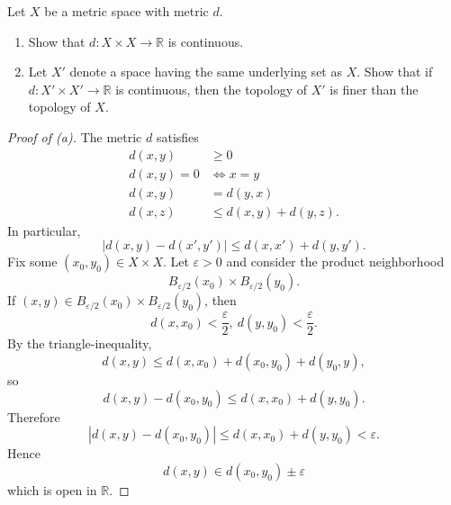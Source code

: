\begin{prob*}[Munkres 20.3]
    Let $X$ be a metric space with metric 
    $d$. 
    \begin{enumerate}[label=\alph*)]
        \item Show that $d : X \times X \to \mathbb R$ is continuous. 
        \item Let $X'$ denote a space having the 
            same underlying set as $X$. Show that 
            if $d : X' \times X' \to \mathbb R$ is continuous, 
            then the topology of $X'$ is finer than 
            the topology of $X$.
    \end{enumerate}
\end{prob*}

\begin{proof}[Proof of (a)]
    The metric $d$ satisfies 
    \begin{align*}
        d(x,y) &\geq 0 \\ 
        d(x,y) = 0 &\Leftrightarrow x = y \\ 
        d(x,y) &= d(y,x) \\ 
        d(x,z) &\leq d(x,y) + d(y,z). 
    \end{align*}
    In particular, 
    \[
        |d(x,y) - d(x',y')| \leq d(x,x') + d(y,y'). 
    \]
    Fix some $(x_0,y_0) \in X\times X$. 
    Let $\varepsilon > 0$ and consider 
    the product neighborhood 
    \[
        B_{\varepsilon/2}(x_0) \times B_{\varepsilon/2}(y_0).
    \]
    If $(x,y) \in B_{\varepsilon/2}(x_0) 
    \times B_{\varepsilon/2}(y_0)$, 
    then 
    \[
        d(x,x_0) < \frac{\varepsilon}{2}, \ 
        d(y,y_0) < \frac{\varepsilon}{2}. 
    \]
    By the triangle-inequality, 
    \[
        d(x,y) \leq d(x,x_0) + d(x_0, y_0) 
        + d(y_0, y), 
    \]
    so 
    \[
        d(x,y) - d(x_0,y_0) 
        \leq d(x,x_0) + d(y,y_0). 
    \]
    Therefore 
    \[
        |d(x,y) - d(x_0,y_0)| 
        \leq d(x,x_0) + d(y,y_0) < \varepsilon. 
    \]
    Hence 
    \[
        d(x,y) \in d(x_0,y_0) \pm \varepsilon 
    \]
    which is open in $\mathbb R$. 
\end{proof}

